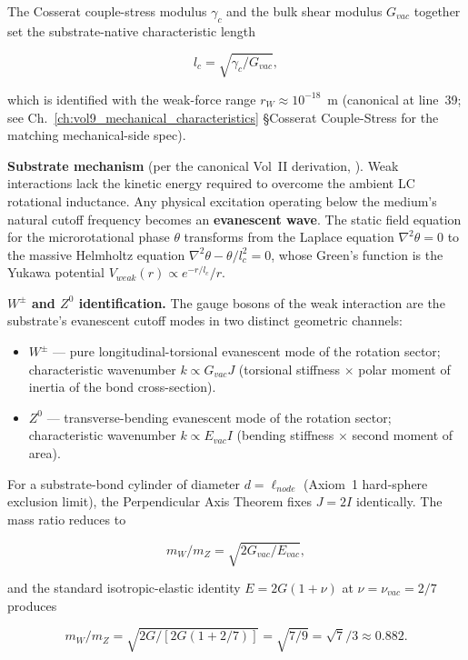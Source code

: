 The Cosserat couple-stress modulus $\gamma_c$ and the bulk shear modulus $G_{vac}$ together set the substrate-native characteristic length

\[
l_c = \sqrt{\gamma_c / G_{vac}},
\]

which is identified with the weak-force range $r_W \approx 10^{-18}$~m (canonical at  line~39; see Ch.~\ref{ch:vol9_mechanical_characteristics} \S Cosserat Couple-Stress for the matching mechanical-side spec).

\textbf{Substrate mechanism} (per the canonical Vol~II derivation, ). Weak interactions lack the kinetic energy required to overcome the ambient LC rotational inductance. Any physical excitation operating below the medium's natural cutoff frequency becomes an \textbf{evanescent wave}. The static field equation for the microrotational phase $\theta$ transforms from the Laplace equation $\nabla^2 \theta = 0$ to the massive Helmholtz equation $\nabla^2 \theta - \theta / l_c^2 = 0$, whose Green's function is the Yukawa potential $V_{weak}(r) \propto e^{-r/l_c}/r$.

\textbf{$W^\pm$ and $Z^0$ identification.} The gauge bosons of the weak interaction are the substrate's evanescent cutoff modes in two distinct geometric channels:

\begin{itemize}
    \item $W^\pm$ --- pure longitudinal-torsional evanescent mode of the rotation sector; characteristic wavenumber $k \propto G_{vac} J$ (torsional stiffness $\times$ polar moment of inertia of the bond cross-section).
    \item $Z^0$ --- transverse-bending evanescent mode of the rotation sector; characteristic wavenumber $k \propto E_{vac} I$ (bending stiffness $\times$ second moment of area).
\end{itemize}

For a substrate-bond cylinder of diameter $d = \ell_{node}$ (Axiom~1 hard-sphere exclusion limit), the Perpendicular Axis Theorem fixes $J = 2 I$ identically. The mass ratio reduces to

\[
m_W / m_Z = \sqrt{2 G_{vac} / E_{vac}},
\]

and the standard isotropic-elastic identity $E = 2 G (1 + \nu)$ at $\nu = \nu_{vac} = 2/7$ produces

\[
m_W / m_Z = \sqrt{2 G / [2 G (1 + 2/7)]} = \sqrt{7/9} = \sqrt{7}/3 \approx 0.882.
\]

